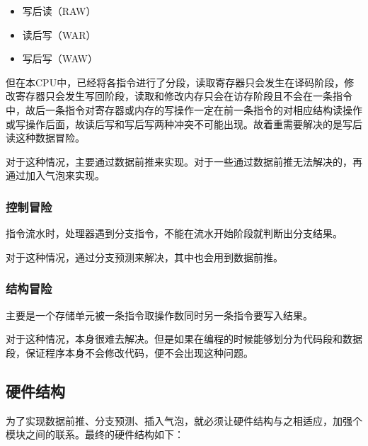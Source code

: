 \begin{itemize}
\itemsep1pt\parskip0pt
\item
  写后读（RAW）
\item
  读后写（WAR）
\item
  写后写（WAW）
\end{itemize}

但在本CPU中，已经将各指令进行了分段，读取寄存器只会发生在译码阶段，修改寄存器只会发生写回阶段，读取和修改内存只会在访存阶段且不会在一条指令中，故后一条指令对寄存器或内存的写操作一定在前一条指令的对相应结构读操作或写操作后面，故读后写和写后写两种冲突不可能出现。故着重需要解决的是写后读这种数据冒险。

对于这种情况，主要通过数据前推来实现。对于一些通过数据前推无法解决的，再通过加入气泡来实现。

\subsubsection{控制冒险}\label{ux63a7ux5236ux5192ux9669}

指令流水时，处理器遇到分支指令，不能在流水开始阶段就判断出分支结果。

对于这种情况，通过分支预测来解决，其中也会用到数据前推。

\subsubsection{结构冒险}\label{ux7ed3ux6784ux5192ux9669}

主要是一个存储单元被一条指令取操作数同时另一条指令要写入结果。

对于这种情况，本身很难去解决。但是如果在编程的时候能够划分为代码段和数据段，保证程序本身不会修改代码，便不会出现这种问题。

\subsection{硬件结构}\label{ux786cux4ef6ux7ed3ux6784-1}

为了实现数据前推、分支预测、插入气泡，就必须让硬件结构与之相适应，加强个模块之间的联系。最终的硬件结构如下：

